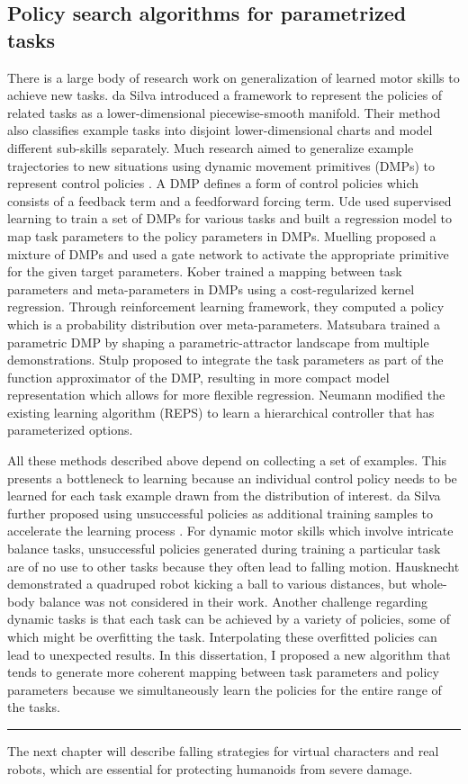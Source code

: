 \subsection{Policy search algorithms for parametrized tasks}
There is a large body of research work on generalization of learned
motor skills to achieve new tasks. da Silva \etal
\cite{DaSilva:2012:LPS,DaSilva:2014:LPM,DaSilva:2014:ACP} introduced a
framework to represent the policies of related tasks as a
lower-dimensional piecewise-smooth manifold. Their method also
classifies example tasks into disjoint lower-dimensional charts and
model different sub-skills separately. Much research aimed to
generalize example trajectories to new situations using dynamic
movement primitives (DMPs) to represent control policies
\cite{Ijspeert:2002:LAL}. A DMP defines a form of control policies
which consists of a feedback term and a feedforward forcing
term. Ude \etal \cite{Ude:2010:TSG} used supervised learning to train a set of
DMPs for various tasks and built a regression model to map task
parameters to the policy parameters in DMPs. 
Muelling \etal \cite{Muelling:2010:LTT}
proposed a mixture of DMPs and used a gate network to activate the
appropriate primitive for the given target parameters.
Kober \etal \cite{Kober:2010:RLA} trained a mapping between task parameters and
meta-parameters in DMPs using a cost-regularized kernel
regression. Through reinforcement learning framework, they computed a
policy which is a probability distribution over meta-parameters.
Matsubara \etal \cite{Matsubara:2011:LPD} trained a parametric DMP by shaping a
parametric-attractor landscape from multiple demonstrations.
Stulp \etal \cite{Stulp:2013:LCP} proposed to integrate the task parameters as
part of the function approximator of the DMP, resulting in more
compact model representation which allows for more flexible
regression. 
Neumann \etal \cite{Neumann:2013:IMS} modified the existing learning
algorithm (REPS) to learn a hierarchical controller that has
parameterized options.

All these methods described above depend on collecting a set of
examples. This presents a bottleneck to learning because an individual
control policy needs to be learned for each task example drawn from
the distribution of interest. da Silva \etal further proposed using
unsuccessful policies as additional training samples to accelerate the
learning process \cite{DaSilva:2014:LPM}. For dynamic motor skills
which involve intricate balance tasks, unsuccessful policies generated
during training a particular task are of no use to other tasks because
they often lead to falling motion. 
Hausknecht \etal \cite{Hausknecht:2010:LPK}
demonstrated a quadruped robot kicking a ball to various distances,
but whole-body balance was not considered in their work.  Another
challenge regarding dynamic tasks is that each task can be achieved by
a variety of policies, some of which might be overfitting the
task. Interpolating these overfitted policies can lead to unexpected
results. In this dissertation, I proposed a new algorithm that
tends to generate more coherent mapping between
task parameters and policy parameters because we simultaneously learn
the policies for the entire range of the tasks.

\rule{\textwidth}{1pt}
The next chapter will describe falling strategies for
virtual characters and real robots, which are essential for
protecting humanoids from severe damage.